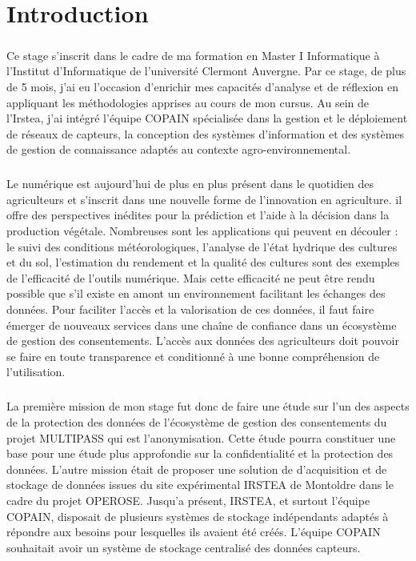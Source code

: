 \renewcommand{\partname}{}
\renewcommand{\chaptername}{}
\renewcommand{\thechapter}{}
\renewcommand{\thesection}{}



\chapter{Introduction}
\paragraph{}
Ce stage s’inscrit dans le cadre de ma formation en Master I Informatique à l’Institut d’Informatique de l’université Clermont Auvergne. Par ce stage, de plus de 5 mois, j’ai eu l’occasion d'enrichir mes capacités d’analyse et de réflexion en appliquant les méthodologies apprises au cours de mon cursus. 
Au sein de l’Irstea, j’ai intégré l’équipe COPAIN spécialisée dans la gestion et le déploiement de réseaux de capteurs, la conception des systèmes d’information et des systèmes de gestion de connaissance adaptés au contexte agro-environnemental.
\paragraph{}
 Le numérique est aujourd'hui de plus en plus présent dans le quotidien des agriculteurs et s’inscrit dans une nouvelle forme de l’innovation en agriculture. il offre des perspectives inédites pour la prédiction et l’aide à la  décision dans la production végétale. Nombreuses sont les applications qui peuvent en découler : le suivi des conditions météorologiques, l’analyse de l’état hydrique des cultures et du sol, l’estimation du rendement et la qualité des cultures sont des exemples de l'efficacité de l’outils numérique. Mais cette efficacité ne peut être rendu possible que s’il existe en amont un environnement facilitant les échanges des données. Pour faciliter l’accès et la valorisation de ces données, il faut faire émerger de nouveaux services dans une chaîne de confiance dans un écosystème de gestion des consentements. L’accès aux données des agriculteurs doit pouvoir se faire en toute transparence et conditionné à une bonne compréhension de l’utilisation.
\paragraph{}
La première mission de mon stage fut donc de faire une étude sur l’un des aspects  de la protection des données  de l’écosystème de gestion des consentements du projet MULTIPASS qui est l’anonymisation. Cette étude pourra constituer une base pour une étude plus approfondie sur la confidentialité et la protection des données.
L’autre mission était de proposer une solution de d’acquisition et de stockage de données issues du site expérimental IRSTEA de Montoldre dans le cadre du projet \gls{OPEROSE}. Jusqu’a présent, IRSTEA, et surtout l’équipe COPAIN, disposait de plusieurs systèmes de stockage indépendants adaptés à répondre aux besoins pour lesquelles ils avaient été créés. L’équipe COPAIN souhaitait avoir un système de stockage centralisé des données capteurs.

